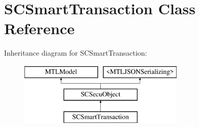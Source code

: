 \hypertarget{interface_s_c_smart_transaction}{}\section{S\+C\+Smart\+Transaction Class Reference}
\label{interface_s_c_smart_transaction}
Inheritance diagram for S\+C\+Smart\+Transaction\+:\begin{figure}[H]
\begin{center}
\leavevmode
\includegraphics[height=3.000000cm]{interface_s_c_smart_transaction}
\end{center}
\end{figure}
